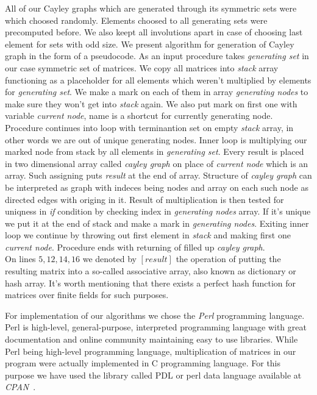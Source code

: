 \documentclass[a4paper,12pt,oneside]{report}%
\begin{document}
All of our Cayley graphs which are generated through its symmetric sets were which choosed randomly. Elements choosed to all generating sets were precomputed before. We also keept all involutions apart in case of choosing last element for sets with odd size. We present algorithm for generation of Cayley graph in the form of a pseudocode. 
As an input procedure takes {\em generating set} in our case symmetric set of matrices. We copy all matrices into {\em stack} array functioning as a placeholder for all elements which weren't multiplied by elements for {\em generating set}. We make a mark on each of them in array {\em generating nodes} to make sure they won't get into {\em stack} again. We also put mark on first one with variable {\em current node}, name is a shortcut for currently generating node. Procedure continues into loop with terminantion set on empty {\em stack} array, in other words we are out of unique generating nodes. Inner loop is multiplying our marked node from stack by all elements in {\em generating set}. Every result is placed in two dimensional array called {\em cayley graph} on place of {\em current node} which is an array. Such assigning puts {\em result} at the end of array. Structure of {\em cayley graph} can be interpreted as graph with indeces being nodes and array on each such node as directed edges with origing in it. Result of multiplication is then tested for uniqness in {\em if} condition by checking index in {\em generating nodes} array. If it's unique we put it at the end of stack and make a mark in {\em generating nodes}. Exiting inner loop we continue by throwing out first element in {\em stack} and making first one {\em current node}. Procedure ends with returning of filled up {\em cayley graph}.  ~\\



On lines $5,12,14,16$ we denoted by $[ result ]$  the operation of putting the resulting matrix into a so-called associative array, also known as dictionary or hash array. It's worth mentioning that there exists a perfect hash function for matrices over finite fields for such purposes.





For implementation of our algorithms we chose the {\em Perl} programming language. Perl is high-level, general-purpose, interpreted programming language with great documentation and online community maintaining easy to use libraries. While Perl being high-level programming language, multiplication of matrices in our program were actually implemented in C programming language. For this purpose we have used the library called PDL or perl data language available at {\em CPAN}~\cite{CPAN}.
\end{document}
